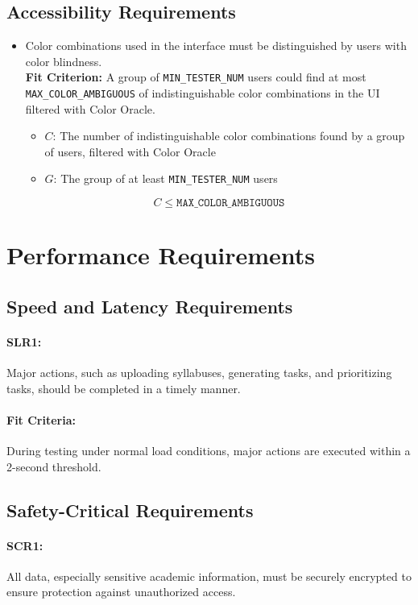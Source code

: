 \documentclass[12pt]{article}
\newcounter{uhrnum} %
\newcommand{\rtheuhrnum}{UHR\refstepcounter{uhrnum}\theuhrnum:}
\begin{document}
\subsection{Accessibility Requirements}
\begin{itemize}[leftmargin=16.5mm,labelsep=4mm,label=\rtheuhrnum]
    \item Color combinations used in the interface must be distinguished by users with color blindness.\\
    
    \textbf{Fit Criterion:} A group of \texttt{MIN\_TESTER\_NUM} users could find at most \texttt{MAX\_COLOR\_AMBIGUOUS} of indistinguishable color combinations in the UI filtered with Color Oracle.
    \begin{itemize}
        \item \( C \): The number of indistinguishable color combinations found by a group of users, filtered with Color Oracle
        \item \( G \): The group of at least \texttt{MIN\_TESTER\_NUM} users
    \end{itemize}
    \[
        C \leq \texttt{MAX\_COLOR\_AMBIGUOUS}
    \]
\end{itemize}
\section{Performance Requirements}

\subsection{Speed and Latency Requirements}
\paragraph{SLR1:} Major actions, such as uploading syllabuses, generating tasks, and prioritizing tasks, should be completed in a timely manner.
\paragraph{Fit Criteria:} During testing under normal load conditions, major actions are executed within a 2-second threshold.

\subsection{Safety-Critical Requirements}
\paragraph{SCR1:} All data, especially sensitive academic information, must be securely encrypted to ensure protection against unauthorized access.
\end{document}
